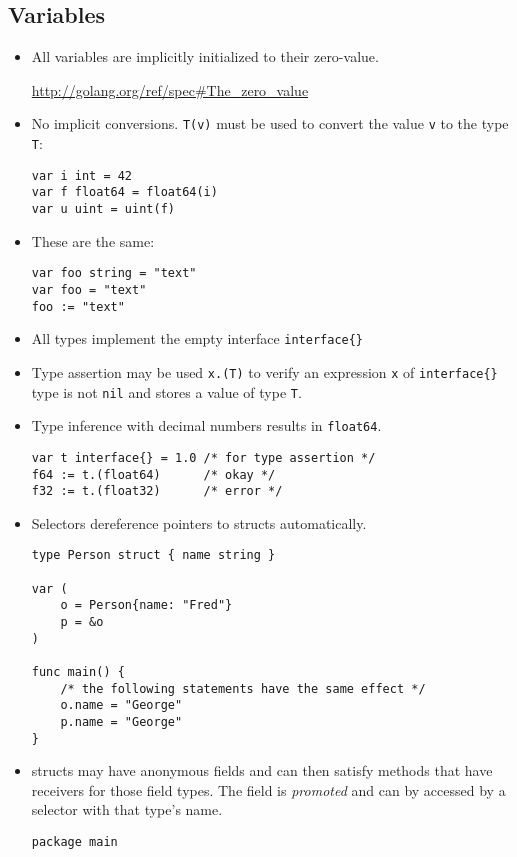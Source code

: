 \documentclass[12pt]{article}
\begin{document}
\subsection{Variables}
\begin{itemize}
    \item All variables are implicitly initialized to their zero-value.

    \url{http://golang.org/ref/spec#The_zero_value}
    \item No implicit conversions. \texttt{T(v)} must be used to convert
          the value \texttt{v} to the type \texttt{T}:
        \begin{verbatim}
var i int = 42
var f float64 = float64(i)
var u uint = uint(f)
        \end{verbatim}
    \item These are the same:
        \begin{verbatim}
var foo string = "text"
var foo = "text"
foo := "text"
        \end{verbatim}
    \item All types implement the empty interface \texttt{interface\{\}}
    \item Type assertion may be used \texttt{x.(T)} to verify an expression
          \texttt{x} of \texttt{interface\{\}} type is not \texttt{nil} and
          stores a value of type \texttt{T}.
    \item Type inference with decimal numbers results in \texttt{float64}.
        \begin{verbatim}
var t interface{} = 1.0 /* for type assertion */
f64 := t.(float64)      /* okay */
f32 := t.(float32)      /* error */
        \end{verbatim}
    \item Selectors dereference pointers to structs automatically.
        \begin{verbatim}
type Person struct { name string }

var (
    o = Person{name: "Fred"}
    p = &o
)

func main() {
    /* the following statements have the same effect */
    o.name = "George"
    p.name = "George"
}

        \end{verbatim}

    \item structs may have anonymous fields and can then satisfy methods
          that have receivers for those field types. The field is
          \textit{promoted} and can by accessed by a selector with that
          type's name.
        \begin{verbatim}
package main


\end{verbatim}
\end{itemize}
\end{document}

